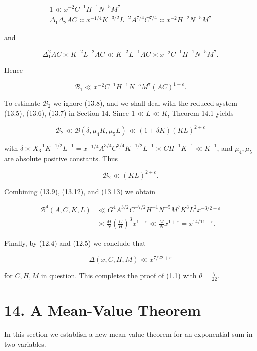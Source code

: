 \documentclass[10pt]{article}
\begin{document}
$$
\begin{gathered}
1 \ll x^{-2} C^{-1} H^{-1} N^{-5} M^{7} \\
\Delta_{1}\Delta_{2}AC\asymp x^{-1 / 4} K^{-3 / 2} L^{-2} A^{7 / 4} C^{7 / 4} \asymp x^{-2} H^{-2} N^{-5} M^{7}
\end{gathered}
$$

and

$$
\Delta_{1}^{2}AC \asymp K^{-2} L^{-2} A C \ll K^{-2} L^{-1} A C \asymp x^{-2} C^{-1} H^{-1} N^{-5} M^{7} .
$$

Hence


\begin{equation*}
\mathscr{B}_{1} \ll x^{-2} C^{-1} H^{-1} N^{-5} M^{7}(A C)^{1+\varepsilon} . \tag{13.12}
\end{equation*}


To estimate $\mathscr{B}_{2}$ we ignore (13.8), and we shall deal with the reduced system (13.5), (13.6), (13.7) in Section 14. Since $1\ll L\ll K$, Theorem 14.1 yields

$$
\mathscr{B}_{2}\ll\mathscr{B}\left(\delta, \mu_{4} K, \mu_{5} L\right) \ll(1+\delta K)(K L)^{2+\varepsilon}
$$

with $\delta \asymp X_{3}^{-1} K^{-1 / 2} L^{-1}=x^{-1 / 4} A^{3 / 4} C^{3 / 4} K^{-1 / 2} L^{-1} \asymp C H^{-1} K^{-1} \ll K^{-1}$, and $\mu_{4}, \mu_{5}$ are absolute positive constants. Thus


\begin{equation*}
\mathscr{B}_{2} \ll(K L)^{2+\varepsilon} . \tag{13.13}
\end{equation*}


Combining (13.9), (13.12), and (13.13) we obtain

$$
\begin{aligned}
\mathscr{B}^{4}(A,C,K,L) & \ll G^{4} A^{3 / 2} C^{-7 / 2} H^{-1} N^{-5} M^{7} K^{3} L^{2} x^{-3 / 2+\varepsilon} \\
& \asymp \frac{M}{N}\left(\frac{C}{H}\right)^{3} x^{1+\varepsilon}\ll\frac{M}{N}x^{1+\varepsilon}=x^{14 / 11+\varepsilon} .
\end{aligned}
$$

Finally, by (12.4) and (12.5) we conclude that

$$
\Delta(x,C,H,M)\ll x^{7/22+\varepsilon}
$$

for $C, H, M$ in question. This completes the proof of (1.1) with $\theta=\frac{7}{22}$.

\section*{14. A Mean-Value Theorem}
In this section we establish a new mean-value theorem for an exponential sum in two variables.
\end{document}

